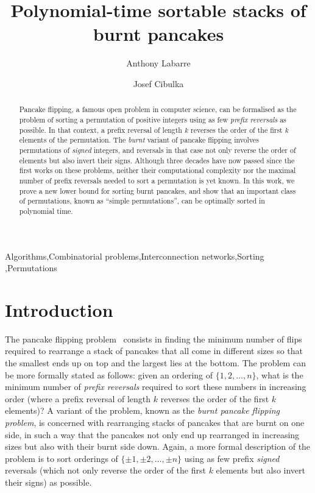\documentclass[review]{elsarticle}
\title{Polynomial-time sortable stacks of burnt pancakes}
\author{Anthony Labarre}
\author{Josef Cibulka\fnref{fn1}}
\begin{document}
\begin{abstract}
Pancake flipping, a famous open problem in computer science, can be formalised as the problem of sorting a permutation of positive integers using as few \emph{prefix reversals} as possible. In that context, a prefix reversal of length $k$ reverses the order of the first $k$ elements of the permutation. The \emph{burnt} variant of pancake flipping involves permutations of \emph{signed} integers, and reversals in that case not only reverse the order of elements but also invert their signs. Although three decades have now passed since the first works on these problems, neither their computational complexity nor the maximal number of prefix reversals needed to sort a permutation is yet known. In this work, we prove a new lower bound for sorting burnt pancakes, and show that an important class of permutations, known as ``simple permutations'', can be optimally sorted in polynomial time.
\end{abstract}

\begin{keyword}
Algorithms\sep Combinatorial problems\sep Interconnection networks\sep Sorting \sep Permutations
\end{keyword}

\maketitle


\section{Introduction}

The pancake flipping problem~\cite{dweighter-elementary} consists in finding the minimum number of flips required to rearrange a stack of pancakes that all come in different sizes so that the smallest ends up on top and the largest lies at the bottom. 
The problem can be more formally stated as follows: given an ordering of $\{1,2,\ldots,n\}$, what is the minimum number of \emph{prefix reversals} required to sort these numbers in increasing order (where a prefix reversal of length $k$ reverses the order of the first $k$ elements)? A variant of the problem, known as the \emph{burnt pancake flipping problem}, is concerned with rearranging stacks of pancakes that are burnt on one side, in such a way that the pancakes not only end up rearranged in increasing sizes but also with their burnt side down. Again, a more formal description of the problem is to sort orderings of $\{\pm 1, \pm 2, \ldots, \pm n\}$ using as few prefix \emph{signed} reversals (which not only reverse the order of the first $k$ elements but also invert their signs) as possible.
\end{document}
